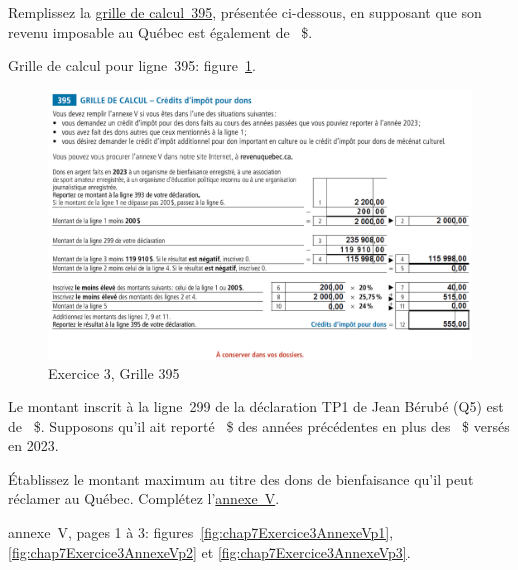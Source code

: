 \begin{sousQuestion}
	Remplissez la \href{https://www.revenuquebec.ca/documents/fr/formulaires/tp/2023-12/TP-1.D.GR%282023-12%29.pdf}{grille de calcul~395}, présentée ci-dessous, en supposant que son revenu imposable au Québec est également de \numprint{235908}~\$.
\end{sousQuestion}
Grille de calcul pour ligne~395: figure~\ref{fig:chap7Exercice3Grille395}.
\begin{figure}
	\centering
	\includegraphics[width=.9\textwidth]{exercice/7-3/Q5/Grille395.png}
	\caption[]{Exercice 3, Grille 395}
	\label{fig:chap7Exercice3Grille395}
\end{figure}

\begin{question}
	Le montant inscrit à la ligne~299 de la déclaration TP1 de Jean Bérubé (Q5) est de ~\$. Supposons qu'il ait reporté ~\$ des années précédentes en plus des ~\$ versés en 2023.
	
	Établissez le montant maximum au titre des dons de bienfaisance qu'il peut réclamer au Québec. Complétez l'\href{https://www.revenuquebec.ca/documents/fr/formulaires/tp/2023-12/TP-1.D.V%282023-12%29.pdf}{annexe~V}.
\end{question}
annexe~V, pages 1 à 3: figures~\ref{fig:chap7Exercice3AnnexeVp1}, \ref{fig:chap7Exercice3AnnexeVp2} et \ref{fig:chap7Exercice3AnnexeVp3}.

